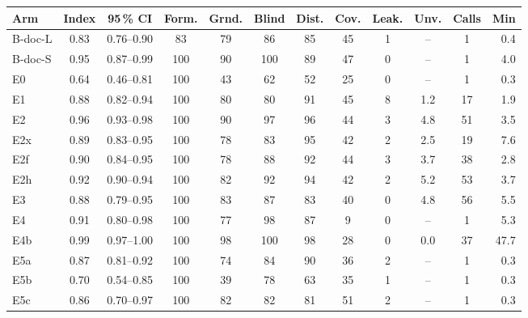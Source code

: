 \begin{tabular}{@{}lccccccccccr@{}}
\toprule
Arm & Index & 95\,\% CI & Form. & Grnd. & Blind & Dist. & Cov. & Leak. & Unv. & Calls & Min \\
\midrule
B-doc-L & 0.83 & 0.76--0.90 & 83 & 79 & 86 & 85 & 45 & 1 & -- & 1 & 0.4 \\
B-doc-S & 0.95 & 0.87--0.99 & 100 & 90 & 100 & 89 & 47 & 0 & -- & 1 & 4.0 \\
E0 & 0.64 & 0.46--0.81 & 100 & 43 & 62 & 52 & 25 & 0 & -- & 1 & 0.3 \\
E1 & 0.88 & 0.82--0.94 & 100 & 80 & 80 & 91 & 45 & 8 & 1.2 & 17 & 1.9 \\
E2 & 0.96 & 0.93--0.98 & 100 & 90 & 97 & 96 & 44 & 3 & 4.8 & 51 & 3.5 \\
E2x & 0.89 & 0.83--0.95 & 100 & 78 & 83 & 95 & 42 & 2 & 2.5 & 19 & 7.6 \\
E2f & 0.90 & 0.84--0.95 & 100 & 78 & 88 & 92 & 44 & 3 & 3.7 & 38 & 2.8 \\
E2h & 0.92 & 0.90--0.94 & 100 & 82 & 92 & 94 & 42 & 2 & 5.2 & 53 & 3.7 \\
E3 & 0.88 & 0.79--0.95 & 100 & 83 & 87 & 83 & 40 & 0 & 4.8 & 56 & 5.5 \\
E4 & 0.91 & 0.80--0.98 & 100 & 77 & 98 & 87 & 9 & 0 & -- & 1 & 5.3 \\
E4b & 0.99 & 0.97--1.00 & 100 & 98 & 100 & 98 & 28 & 0 & 0.0 & 37 & 47.7 \\
E5a & 0.87 & 0.81--0.92 & 100 & 74 & 84 & 90 & 36 & 2 & -- & 1 & 0.3 \\
E5b & 0.70 & 0.54--0.85 & 100 & 39 & 78 & 63 & 35 & 1 & -- & 1 & 0.3 \\
E5c & 0.86 & 0.70--0.97 & 100 & 82 & 82 & 81 & 51 & 2 & -- & 1 & 0.3 \\
\bottomrule
\end{tabular}
